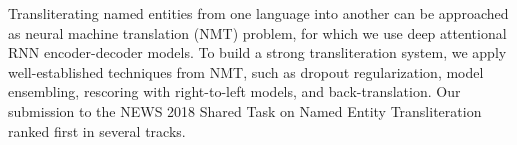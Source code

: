 Transliterating named entities from one language into another can be approached as neural machine translation (NMT) problem, for which we use deep attentional RNN encoder-decoder models.  To build a strong transliteration system, we apply well-established techniques from NMT, such as dropout regularization, model ensembling, rescoring with right-to-left models, and back-translation.  Our submission to the NEWS 2018 Shared Task on Named Entity Transliteration ranked first in several tracks.
